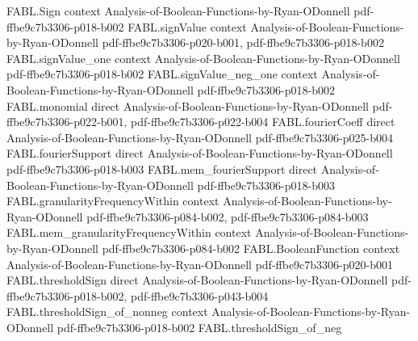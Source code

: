 \begin{theorem}
\label{FABL.isEqualWeightThreshold_of_symmetric_monotone}
\leanok
{}
\proofstep
  {FABL.Sign}
  {context}
  {Analysis-of-Boolean-Functions-by-Ryan-ODonnell}
  {pdf-ffbe9c7b3306-p018-b002}
\proofstep
  {FABL.signValue}
  {context}
  {Analysis-of-Boolean-Functions-by-Ryan-ODonnell}
  {pdf-ffbe9c7b3306-p020-b001,
    pdf-ffbe9c7b3306-p018-b002}
\proofstep
  {FABL.signValue_one}
  {context}
  {Analysis-of-Boolean-Functions-by-Ryan-ODonnell}
  {pdf-ffbe9c7b3306-p018-b002}
\proofstep
  {FABL.signValue_neg_one}
  {context}
  {Analysis-of-Boolean-Functions-by-Ryan-ODonnell}
  {pdf-ffbe9c7b3306-p018-b002}
\proofstep
  {FABL.monomial}
  {direct}
  {Analysis-of-Boolean-Functions-by-Ryan-ODonnell}
  {pdf-ffbe9c7b3306-p022-b001,
    pdf-ffbe9c7b3306-p022-b004}
\proofstep
  {FABL.fourierCoeff}
  {direct}
  {Analysis-of-Boolean-Functions-by-Ryan-ODonnell}
  {pdf-ffbe9c7b3306-p025-b004}
\proofstep
  {FABL.fourierSupport}
  {direct}
  {Analysis-of-Boolean-Functions-by-Ryan-ODonnell}
  {pdf-ffbe9c7b3306-p018-b003}
\proofstep
  {FABL.mem_fourierSupport}
  {direct}
  {Analysis-of-Boolean-Functions-by-Ryan-ODonnell}
  {pdf-ffbe9c7b3306-p018-b003}
\proofstep
  {FABL.granularityFrequencyWithin}
  {context}
  {Analysis-of-Boolean-Functions-by-Ryan-ODonnell}
  {pdf-ffbe9c7b3306-p084-b002,
    pdf-ffbe9c7b3306-p084-b003}
\proofstep
  {FABL.mem_granularityFrequencyWithin}
  {context}
  {Analysis-of-Boolean-Functions-by-Ryan-ODonnell}
  {pdf-ffbe9c7b3306-p084-b002}
\proofstep
  {FABL.BooleanFunction}
  {context}
  {Analysis-of-Boolean-Functions-by-Ryan-ODonnell}
  {pdf-ffbe9c7b3306-p020-b001}
\proofstep
  {FABL.thresholdSign}
  {direct}
  {Analysis-of-Boolean-Functions-by-Ryan-ODonnell}
  {pdf-ffbe9c7b3306-p018-b002,
    pdf-ffbe9c7b3306-p043-b004}
\proofstep
  {FABL.thresholdSign_of_nonneg}
  {context}
  {Analysis-of-Boolean-Functions-by-Ryan-ODonnell}
  {pdf-ffbe9c7b3306-p018-b002}
\proofstep
  {FABL.thresholdSign_of_neg}

\end{theorem}
